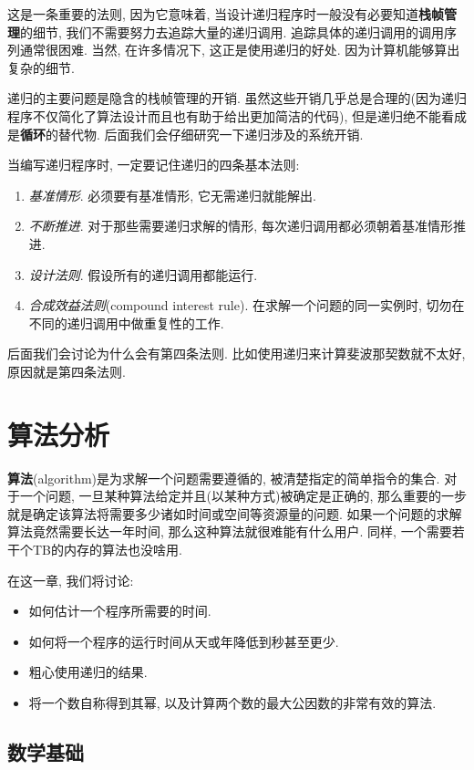 \documentclass[oneside]{ctexbook}
\begin{document}
{这是一条重要的法则, 因为它意味着, 当设计递归程序时一般没有必要知道\textbf{栈帧管理}的细节, 我们不需要努力去追踪大量的递归调用. 追踪具体的递归调用的调用序列通常很困难. 当然, 在许多情况下, 这正是使用递归的好处. 因为计算机能够算出复杂的细节.

递归的主要问题是隐含的栈帧管理的开销. 虽然这些开销几乎总是合理的(因为递归程序不仅简化了算法设计而且也有助于给出更加简洁的代码), 但是递归绝不能看成是\textbf{循环}的替代物. 后面我们会仔细研究一下递归涉及的系统开销.

当编写递归程序时, 一定要记住递归的四条基本法则:

\begin{enumerate}
    \item \textit{基准情形}. 必须要有基准情形, 它无需递归就能解出.
    \item \textit{不断推进}. 对于那些需要递归求解的情形, 每次递归调用都必须朝着基准情形推进.
    \item \textit{设计法则}. 假设所有的递归调用都能运行.
    \item \textit{合成效益法则}(compound interest rule). 在求解一个问题的同一实例时, 切勿在不同的递归调用中做重复性的工作. 
\end{enumerate}

后面我们会讨论为什么会有第四条法则. 比如使用递归来计算斐波那契数就不太好, 原因就是第四条法则.

\chapter{算法分析}

\textbf{算法}(algorithm)是为求解一个问题需要遵循的, 被清楚指定的简单指令的集合. 对于一个问题, 一旦某种算法给定并且(以某种方式)被确定是正确的, 那么重要的一步就是确定该算法将需要多少诸如时间或空间等资源量的问题. 如果一个问题的求解算法竟然需要长达一年时间, 那么这种算法就很难能有什么用户. 同样, 一个需要若干个TB的内存的算法也没啥用.

在这一章, 我们将讨论:

\begin{itemize}
    \item 如何估计一个程序所需要的时间.
    \item 如何将一个程序的运行时间从天或年降低到秒甚至更少.
    \item 粗心使用递归的结果.
    \item 将一个数自称得到其幂, 以及计算两个数的最大公因数的非常有效的算法.
\end{itemize}

\section{数学基础}\label{数学基础}

}
\end{document}
